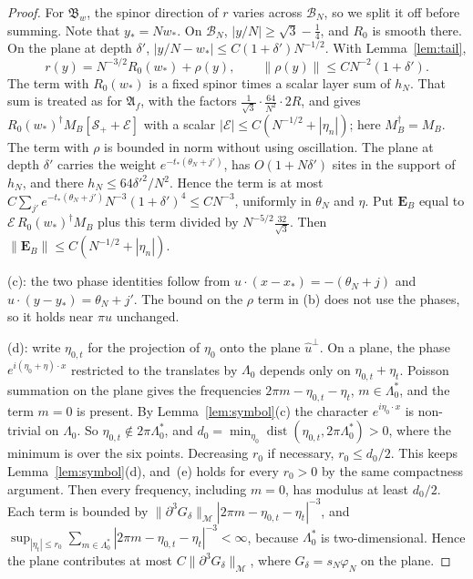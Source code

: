 \documentclass[11pt]{amsart}
\theoremstyle{definition}
\theoremstyle{remark}
\newcommand{\cB}{\mathcal{B}}
\newcommand{\cS}{\mathcal{S}}
\newcommand{\uhat}{\hat u}
\begin{document}
\begin{proof}
For $\mathfrak B_w$, the spinor direction of $r$ varies across $\cB_N$, so
we split it off before summing.  Note that $y_*=Nw_*$.  On $\cB_N$,
$|y/N|\ge\sqrt3-\frac14$, and $R_0$ is smooth there.  On the plane at depth
$\delta'$, $|y/N-w_*|\le C(1+\delta')N^{-1/2}$.  With Lemma~\ref{lem:tail},
\[
r(y)=N^{-3/2}R_0(w_*)+\rho(y),\qquad\|\rho(y)\|\le CN^{-2}(1+\delta').
\]
The term with $R_0(w_*)$ is a fixed spinor times a scalar layer sum of $h_N$.
That sum is treated as for $\mathfrak A_f$, with the factors
$\frac1{\sqrt3}\cdot\frac{64}{N^2}\cdot2R$, and gives
$R_0(w_*)^\dagger M_B[\cS_++\mathcal E]$ with a scalar
$|\mathcal E|\le C(N^{-1/2}+|\eta_n|)$; here $M_B^\dagger=M_B$.  The term with
$\rho$ is bounded in norm without using oscillation.  The plane at depth
$\delta'$ carries the weight $e^{-t_*(\theta_N+j')}$, has $O(1+N\delta')$ sites
in the support of $h_N$, and there $h_N\le64\delta'^2/N^2$.  Hence the term
is at most $C\sum_{j'}e^{-t_*(\theta_N+j')}N^{-3}(1+\delta')^4\le CN^{-3}$,
uniformly in $\theta_N$ and $\eta$.  Put $\mathbf E_B$ equal to
$\mathcal E\,R_0(w_*)^\dagger M_B$ plus this term divided by
$N^{-5/2}\frac{32}{\sqrt3}$.  Then
$\|\mathbf E_B\|\le C(N^{-1/2}+|\eta_n|)$.

(c): the two phase identities follow from $u\cdot(x-x_*)=-(\theta_N+j)$ and
$u\cdot(y-y_*)=\theta_N+j'$.  The
bound on the $\rho$ term in (b) does not use the phases, so it holds near
$\pi u$ unchanged.

(d): write $\eta_{0,t}$ for the projection of $\eta_0$ onto the plane
$\uhat^\perp$.  On a plane, the phase $e^{i(\eta_0+\eta)\cdot x}$ restricted
to the translates by $\Lambda_0$ depends only on $\eta_{0,t}+\eta_t$.  Poisson
summation on the plane gives the frequencies $2\pi m-\eta_{0,t}-\eta_t$,
$m\in\Lambda_0^*$, and the term $m=0$ is present.  By
Lemma~\ref{lem:symbol}(c) the character $e^{i\eta_0\cdot x}$ is non-trivial
on $\Lambda_0$.  So $\eta_{0,t}\notin2\pi\Lambda_0^*$, and
$d_0=\min_{\eta_0}\operatorname{dist}(\eta_{0,t},2\pi\Lambda_0^*)>0$, where
the minimum is over the six points.  Decreasing $r_0$ if necessary,
$r_0\le d_0/2$.  This keeps Lemma~\ref{lem:symbol}(d), and~(e) holds for every
$r_0>0$ by the same compactness argument.  Then every frequency, including
$m=0$, has modulus at least $d_0/2$.  Each term is bounded by
$\|\partial^3G_\delta\|_{\mathcal M}|2\pi m-\eta_{0,t}-\eta_t|^{-3}$, and
$\sup_{|\eta_t|\le r_0}\sum_{m\in\Lambda_0^*}|2\pi m-\eta_{0,t}-\eta_t|^{-3}<\infty$,
because $\Lambda_0^*$ is two-dimensional.  Hence the plane contributes at
most $C\|\partial^3G_\delta\|_{\mathcal M}$, where $G_\delta=s_N\varphi_N$ on
the plane.


\end{proof}
\end{document}
